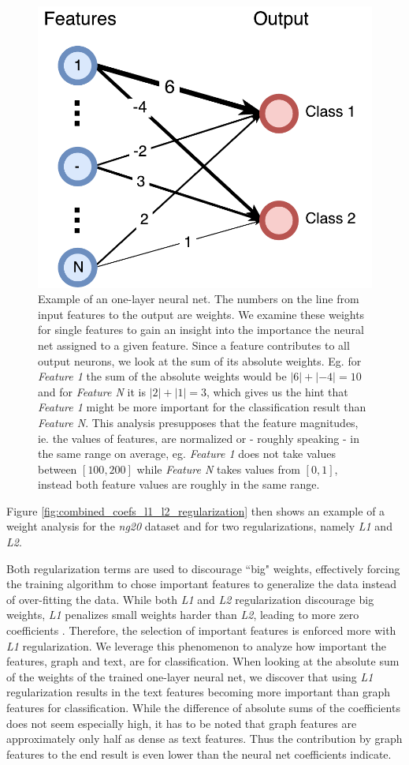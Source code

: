 \begin{figure}[htb!]
	\centering
	{\includegraphics[width=0.5\linewidth]{assets/figures/coefs_example.pdf}%
		\caption[Example: One-layer neural net]{%
			Example of an one-layer neural net. The numbers on the line from input features to the output are weights.
			We examine these weights for single features to gain an insight into the importance the neural net assigned to a given feature. Since a feature contributes to all output neurons, we look at the sum of its absolute weights. Eg. for \textit{Feature 1} the sum of the absolute weights would be $|6| + |-4| = 10$ and for \textit{Feature N} it is $|2| + |1| = 3$, which gives us the hint that \textit{Feature 1} might be more important for the classification result than \textit{Feature N}.
			This analysis presupposes that the feature magnitudes, ie. the values of features, are normalized or - roughly speaking - in the same range on average, eg. \textit{Feature 1} does not take values between $[100, 200]$ while \textit{Feature N} takes values from $[0, 1]$, instead both feature values are roughly in the same range.
		}%
		\label{fig:coefs_example_one_layer}}
\end{figure}

Figure \ref{fig:combined_coefs_l1_l2_regularization} then shows an example of a weight analysis for the \textit{ng20} dataset and for two regularizations, namely \textit{L1} and \textit{L2}.

Both regularization terms are used to discourage ``big" weights, effectively forcing the training algorithm to chose important features to generalize the data instead of over-fitting the data.
While both \textit{L1} and \textit{L2} regularization discourage big weights, \textit{L1} penalizes small weights harder than \textit{L2}, leading to more zero coefficients \cite[p.~13]{Hastie2009}.
Therefore, the selection of important features is enforced more with \textit{L1} regularization.
We leverage this phenomenon to analyze how important the features, graph and text, are for classification.
When looking at the absolute sum of the weights of the trained one-layer neural net, we discover that using \textit{L1} regularization results in the text features becoming more important than graph features for classification.
While the difference of absolute sums of the coefficients does not seem especially high, it has to be noted that graph features are approximately only half as dense as text features.
Thus the contribution by graph features to the end result is even lower than the neural net coefficients indicate.

